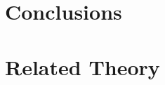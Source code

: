 \documentclass[hyperref]{gatech-thesis}
\begin{document}
  \chapter{Conclusions}
  \label{chap:Conclusions}%
  


  \appendix

  \chapter{Related Theory}
  \label{chap:RelatedTheory}
  

%   


  \begin{postliminary}
  \end{postliminary}
\end{document}
